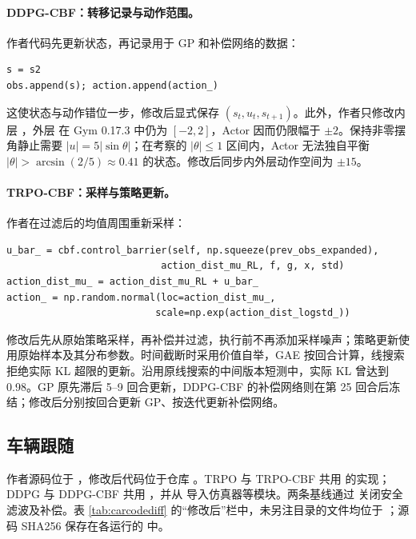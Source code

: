 \documentclass[UTF8,a4paper,zihao=-4,fontset=fandol]{ctexart}
\begin{document}
\paragraph{DDPG-CBF：转移记录与动作范围。}
作者代码先更新状态，再记录用于 GP 和补偿网络的数据：
\begin{lstlisting}
s = s2
obs.append(s); action.append(action_)
\end{lstlisting}
这使状态与动作错位一步，修改后显式保存 $(s_t,u_t,s_{t+1})$。此外，作者只修改内层 ，外层  在 Gym 0.17.3 中仍为 $[-2,2]$，Actor 因而仍限幅于 $\pm2$。保持非零摆角静止需要 $|u|=5|\sin\theta|$；在考察的 $|\theta|\le1$ 区间内，Actor 无法独自平衡 $|\theta|>\arcsin(2/5)\approx0.41$ 的状态。修改后同步内外层动作空间为 $\pm15$。

\paragraph{TRPO-CBF：采样与策略更新。}
作者在过滤后的均值周围重新采样：
\begin{lstlisting}
u_bar_ = cbf.control_barrier(self, np.squeeze(prev_obs_expanded),
                           action_dist_mu_RL, f, g, x, std)
action_dist_mu_ = action_dist_mu_RL + u_bar_
action_ = np.random.normal(loc=action_dist_mu_,
                          scale=np.exp(action_dist_logstd_))
\end{lstlisting}
修改后先从原始策略采样，再补偿并过滤，执行前不再添加采样噪声；策略更新使用原始样本及其分布参数。时间截断时采用价值自举，GAE 按回合计算，线搜索拒绝实际 KL 超限的更新。沿用原线搜索的中间版本短测中，实际 KL 曾达到 0.98。GP 原先滞后 5–9 回合更新，DDPG-CBF 的补偿网络则在第 25 回合后冻结；修改后分别按回合更新 GP、按迭代更新补偿网络。

\subsection{车辆跟随}
\label{app:code-car}
作者源码位于 ，修改后代码位于仓库 。TRPO 与 TRPO-CBF 共用  的实现；DDPG 与 DDPG-CBF 共用 ，并从  导入仿真器等模块。两条基线通过  关闭安全滤波及补偿。表 \ref{tab:carcodediff} 的“修改后”栏中，未另注目录的文件均位于 ；源码 SHA256 保存在各运行的  中。
\end{document}
